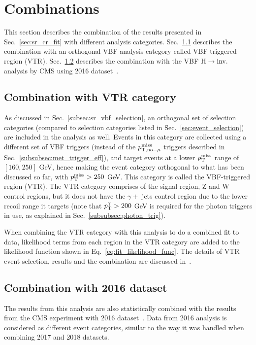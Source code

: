 \section{Combinations}

\graphicspath{{4_Results/Figures}}

\newcommand\combPlotDir{from_paper}

This section describes the combination of the results presented in Sec.~\ref{sec:sr_cr_fit}
with different analysis categories. Sec.~\ref{subsec:comb_with_vtr} describes the combination with
an orthogonal VBF analysis category called VBF-triggered region (VTR). Sec.~\ref{subsec:comb_with_2016}
describes the combination with the VBF $\textrm{H} \rightarrow \textrm{inv.}$ analysis by CMS using 2016 dataset~\cite{paper:VBF_HToInv_2016}.   

\subsection{Combination with VTR category}
\label{subsec:comb_with_vtr}

As discussed in Sec.~\ref{subsec:sr_vbf_selection}, an orthogonal set of selection categories (compared to selection categories listed in Sec.~\ref{sec:event_selection})
are included in the analysis as well. 
Events in this category are collected using a different set of VBF triggers (instead of the $p_{\textrm{T},\textrm{no}-\mu}^{\textrm{miss}}$ triggers
described in Sec.~\ref{subsubsec:met_trigger_eff}), and target events at a lower $p_{\textrm{T}}^{\textrm{miss}}$ range of $[160, 250]$ GeV, hence making the event category
orthogonal to what has been discussed so far, with $p_{\textrm{T}}^{\textrm{miss}} > 250$ GeV.
This category is called the VBF-triggered region (VTR). The VTR category comprises of the signal region, Z and W control regions, but it does not
have the $\gamma +$ jets control region due to the lower recoil range it targets (note that $p_{\textrm{T}}^{\gamma} > 200$ GeV is required for the
photon triggers in use, as explained in Sec.~\ref{subsubsec:photon_trig}). 

When combining the VTR category with this analysis to do a combined fit to data, likelihood terms from each region in the VTR category
are added to the likelihood function shown in Eq.~\ref{eq:fit_likelihood_func}.
The details of VTR event selection, results and the combination are discussed in~\cite{VBFHinvAnalysisPaper}.

\subsection{Combination with 2016 dataset}
\label{subsec:comb_with_2016}
The results from this analysis are also statistically combined with the results from the CMS experiment
with 2016 dataset~\cite{paper:VBF_HToInv_2016}. Data from 2016 analysis is considered as different event categories,
similar to the way it was handled when combining 2017 and 2018 datasets. 

